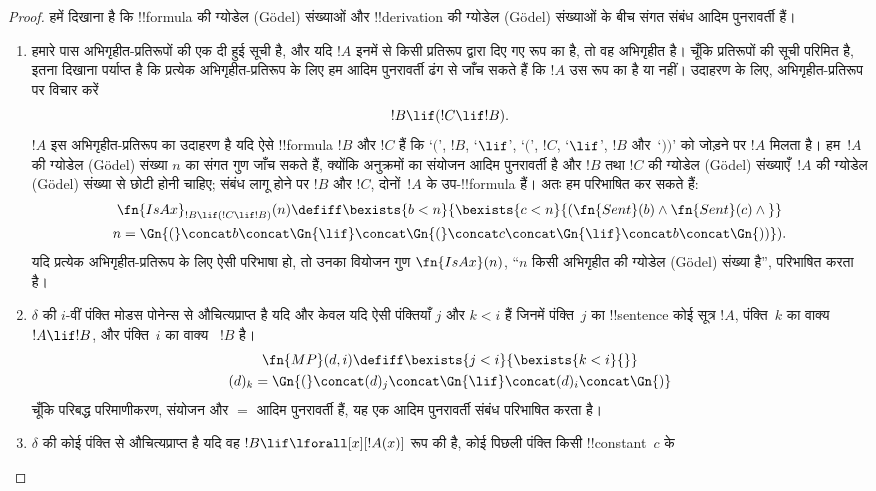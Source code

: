\documentclass[../../../include/open-logic-section]{subfiles}
\begin{document}
\begin{proof}
हमें दिखाना है कि !!{formula} की ग्योडेल (G\"odel) संख्याओं और !!{derivation}
की ग्योडेल (G\"odel) संख्याओं के बीच संगत संबंध आदिम पुनरावर्ती हैं।
\begin{enumerate}
\item हमारे पास अभिगृहीत-प्रतिरूपों की एक दी हुई सूची है, और यदि $!A$ इनमें
  से किसी प्रतिरूप द्वारा दिए गए रूप का है, तो वह अभिगृहीत है। चूँकि
  प्रतिरूपों की सूची परिमित है, इतना दिखाना पर्याप्त है कि प्रत्येक
  अभिगृहीत-प्रतिरूप के लिए हम आदिम पुनरावर्ती ढंग से जाँच सकते हैं कि $!A$ उस
  रूप का है या नहीं। उदाहरण के लिए, अभिगृहीत-प्रतिरूप पर विचार करें
  \[
  !B \lif (!C \lif !B).
  \]
  $!A$ इस अभिगृहीत-प्रतिरूप का उदाहरण है यदि ऐसे !!{formula} $!B$ और $!C$
  हैं कि `$($', $!B$, `$\lif$', `$($', $!C$, `$\lif$', $!B$ और~`$))$' को
  जोड़ने पर $!A$ मिलता है। हम~$!A$ की ग्योडेल (G\"odel) संख्या $n$ का संगत
  गुण जाँच सकते हैं, क्योंकि अनुक्रमों का संयोजन आदिम पुनरावर्ती है और $!B$
  तथा $!C$ की ग्योडेल (G\"odel) संख्याएँ~$!A$ की ग्योडेल (G\"odel) संख्या
  से छोटी होनी चाहिए; संबंध लागू होने पर $!B$ और $!C$, दोनों~$!A$ के
  उप-!!{formula} हैं। अतः हम परिभाषित कर सकते हैं:
  \begin{multline*}
  \fn{IsAx}_{!B \lif (!C \lif !B)}(n) \defiff \bexists{b< n}{
    \bexists{c < n}{(\fn{Sent}(b) \land \fn{Sent}(c) \land {}}}\\ n =
  \Gn{(} \concat b \concat \Gn{\lif} \concat \Gn{(} \concat c \concat
  \Gn{\lif} \concat b \concat \Gn{))}).
  \end{multline*}
  यदि प्रत्येक अभिगृहीत-प्रतिरूप के लिए ऐसी परिभाषा हो, तो उनका वियोजन गुण
  $\fn{IsAx}(n)$, ``$n$ किसी अभिगृहीत की ग्योडेल (G\"odel) संख्या है'',
  परिभाषित करता है।
\item $\delta$ की $i$-वीं पंक्ति मोडस पोनेन्स से औचित्यप्राप्त है यदि और
  केवल यदि ऐसी पंक्तियाँ $j$ और $k < i$ हैं जिनमें पंक्ति~$j$ का !!{sentence}
  कोई सूत्र $!A$, पंक्ति~$k$ का वाक्य $!A \lif !B$, और पंक्ति~$i$ का वाक्य
  ~$!B$ है।
  \begin{multline*}
    \fn{MP}(d, i) \defiff \bexists{j < i}{\bexists{k < i}{}}\\
    (d)_k = \Gn{(} \concat (d)_j
      \concat \Gn{\lif} \concat (d)_i \concat \Gn{)}
  \end{multline*}
  चूँकि परिबद्ध परिमाणीकरण, संयोजन और $=$ आदिम पुनरावर्ती हैं, यह एक आदिम
  पुनरावर्ती संबंध परिभाषित करता है।
\item $\delta$ की कोई पंक्ति \QR{} से औचित्यप्राप्त है यदि वह $!B \lif
  \lforall[x][!A(x)]$ रूप की है, कोई पिछली पंक्ति किसी !!{constant}~$c$ के

\end{enumerate}
\end{proof}
\end{document}
